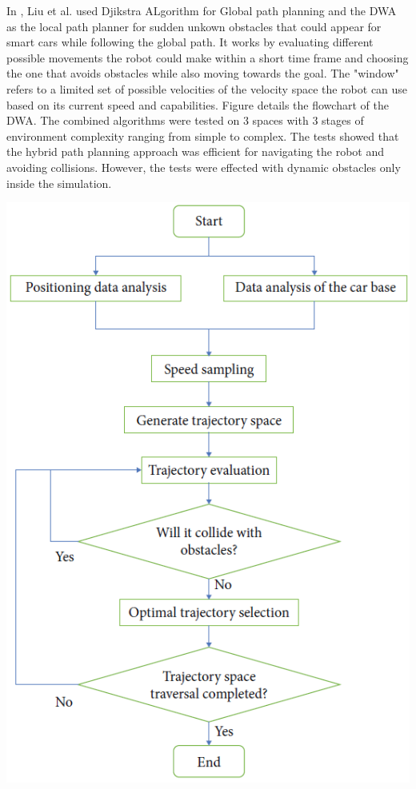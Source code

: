 \noindent
\begin{minipage}{0.5\textwidth}  
    In \cite{R19}, Liu et al. used Djikstra ALgorithm for Global path planning and 
    the DWA as the local path planner for sudden unkown obstacles that could 
    appear for smart cars while following the global path.
    It works by evaluating different possible movements the robot could make within a short time frame 
    and choosing the one that avoids obstacles while also moving towards the goal. The "window" refers 
    to a limited set of possible velocities of the velocity space the robot can use based on its current 
    speed and capabilities. Figure  details the flowchart of the DWA. 
    The combined algorithms were tested on 3 spaces with 3 stages of environment complexity ranging from 
    simple to complex. The tests showed that the hybrid path planning approach was efficient for navigating the 
    robot and avoiding collisions. However, the tests were effected with dynamic obstacles only inside the simulation.
\end{minipage} 
\begin{minipage}{0.5\textwidth}  
    \centering  
    \includegraphics[width=\linewidth]{images/Chap1/DWA_flowchart.png}  
    \label{flowchart of the DWA}  
\end{minipage}  


